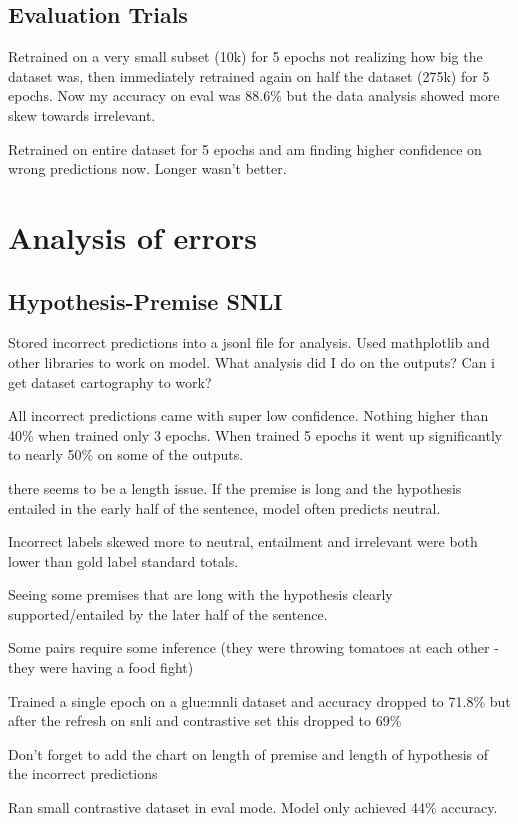 \documentclass[11pt]{article}
\begin{document}
\subsection{Evaluation Trials}
Retrained on a very small subset (10k) for 5 epochs not realizing how big the dataset was, then immediately retrained again on half the dataset (275k) for 5 epochs. Now my accuracy on eval was 88.6\% but the data analysis showed more skew towards irrelevant.

Retrained on entire dataset for 5 epochs and am finding higher confidence on wrong predictions now. Longer wasn't better.

\section{Analysis of errors}
\subsection{Hypothesis-Premise SNLI}

Stored incorrect predictions into a jsonl file for analysis. Used mathplotlib and other libraries to work on model.
What analysis did I do on the outputs? Can i get dataset cartography to work?

All incorrect predictions came with super low confidence. Nothing higher than 40\% when trained only 3 epochs. When trained 5 epochs it went up significantly to nearly 50\% on some of the outputs.

there seems to be a length issue. If the premise is long and the hypothesis entailed in the early half of the sentence, model often predicts neutral.

Incorrect labels skewed more to neutral, entailment and irrelevant were both lower than gold label standard totals.

Seeing some premises that are long with the hypothesis clearly supported/entailed by the later half of the sentence. 

Some pairs require some inference (they were throwing tomatoes at each other - they were having a food fight)

Trained a single epoch on a glue:mnli dataset and accuracy dropped to 71.8\%  but after the refresh on snli and contrastive set this dropped to 69\%

Don't forget to add the chart on length of premise and length of hypothesis of the incorrect predictions

Ran small contrastive dataset in eval mode. Model only achieved 44\% accuracy.
\end{document}

